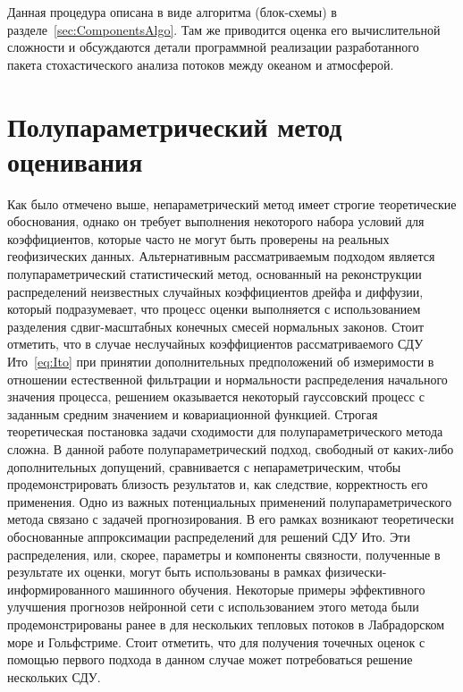 Данная процедура описана в виде алгоритма (блок-схемы) в разделе~\ref{sec:ComponentsAlgo}. Там же приводится оценка его вычислительной сложности и обсуждаются детали программной реализации разработанного пакета стохастического анализа потоков между океаном и атмосферой. 

\section{Полупараметрический метод оценивания}
\label{sec:Semiparametric}
Как было отмечено выше, непараметрический метод имеет строгие теоретические обоснования, однако он требует выполнения некоторого набора условий для коэффициентов, которые часто не могут быть проверены на реальных геофизических данных. Альтернативным рассматриваемым подходом является полупараметрический статистический метод, основанный на реконструкции распределений неизвестных случайных коэффициентов дрейфа и диффузии, который подразумевает, что процесс оценки выполняется с использованием разделения сдвиг-масштабных конечных смесей нормальных законов. Стоит отметить, что в случае неслучайных коэффициентов рассматриваемого СДУ Ито~\eqref{eq:Ito} при принятии дополнительных предположений об измеримости в отношении естественной фильтрации и нормальности распределения начального значения процесса, решением оказывается некоторый гауссовский процесс с заданным средним значением и ковариационной функцией. Строгая теоретическая постановка задачи сходимости для полупараметрического метода сложна. В данной работе полупараметрический подход, свободный от каких-либо дополнительных допущений, сравнивается с непараметрическим, чтобы продемонстрировать близость результатов и, как следствие, корректность его применения. Одно из важных потенциальных применений полупараметрического метода связано с задачей прогнозирования. В его рамках возникают теоретически обоснованные аппроксимации распределений для решений СДУ Ито. Эти распределения, или, скорее, параметры и компоненты связности, полученные в результате их оценки, могут быть использованы в рамках физически-информированного машинного обучения. Некоторые примеры эффективного улучшения прогнозов нейронной сети с использованием этого метода были продемонстрированы ранее в \cite{Kuzmin2022} для нескольких тепловых потоков в Лабрадорском море и Гольфстриме. Стоит отметить, что для получения точечных оценок с помощью первого подхода в данном случае может потребоваться решение нескольких СДУ.


